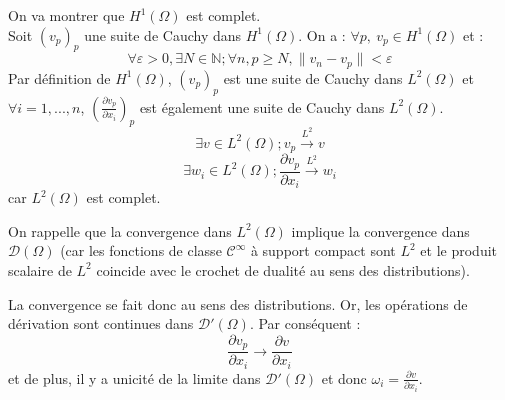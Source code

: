 \begin{dem}
On va montrer que $H^1(\Omega)$ est complet.\\
Soit $(v_p)_p$ une suite de Cauchy dans $H^1(\Omega)$. On a : $\forall p,\ v_p\in H^1(\Omega)$ et :
\[\forall \varepsilon>0, \exists N\in\mathbb{N}; \forall n,p\geq N, \|v_n-v_p\|<\varepsilon\]
Par définition de $H^1(\Omega)$, $(v_p)_p$ est une suite de Cauchy dans $L^2(\Omega)$ et $\forall i=1,...,n$, $\left(\frac{\partial v_p}{\partial x_i} \right)_p$ est également une suite de Cauchy dans $L^2(\Omega)$.\\
\[\exists v\in L^2(\Omega); v_p\xrightarrow{L^2} v\]
\[\exists w_i\in L^2(\Omega); \frac{\partial v_p}{\partial x_i}\xrightarrow{L^2} w_i\]
car $L^2(\Omega)$ est complet.

\bigskip
On rappelle que la convergence dans $L^2(\Omega)$ implique la convergence dans $\mathcal{D}(\Omega)$ (car les fonctions de classe $\mathcal{C}^\infty$ à support compact sont $L^2$ et le produit scalaire de $L^2$ coincide avec le crochet de dualité au sens des distributions).

\bigskip
La convergence se fait donc au sens des distributions. Or, les opérations de dérivation sont continues dans $\mathcal{D}'(\Omega)$. Par conséquent :
\[\frac{\partial v_p}{\partial x_i} \to \frac{\partial v}{\partial x_i}\]
et de plus, il y a unicité de la limite dans $\mathcal{D}'(\Omega)$ et donc $\omega_i=\frac{\partial v}{\partial x_i}$.
\end{dem}




